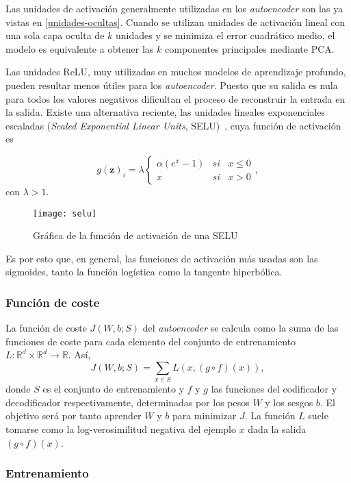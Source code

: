 Las unidades de activación generalmente utilizadas en los \textit{autoencoder} son las ya vistas en \autoref{unidades-ocultas}. Cuando se utilizan unidades de activación lineal con una sola capa oculta de $k$ unidades y se minimiza el error cuadrático medio, el modelo es equivalente a obtener las $k$ componentes principales mediante PCA.

Las unidades ReLU, muy utilizadas en muchos modelos de aprendizaje profundo, pueden resultar menos útiles para los \textit{autoencoder}. Puesto que su salida es nula para todos los valores negativos dificultan el proceso de reconstruir la entrada en la salida. Existe una alternativa reciente, las unidades lineales exponenciales escaladas (\textit{Scaled Exponential Linear Units}, SELU)~\cite{klambauer2017self}, cuya función de activación es

$$g(\textbf{z})_i = \lambda \left\{ \begin{array}{lcc}
             \alpha (e^x - 1) &   si  & x \leq 0
             \\ x &  si & x > 0
             \end{array}
   \right.,$$
con $\lambda > 1$.

\begin{figure}[htpb]
  \centering
  \texttt{[image: selu]}
  \caption{Gráfica de la función de activación de una SELU}
  \label{fig:selu}
\end{figure}

Es por esto que, en general, las funciones de activación más usadas son las sigmoides, tanto la función logística como la tangente hiperbólica.

\subsubsection{Función de coste}

La función de coste $J(W,b;S)$ del \textit{autoencoder} se calcula como la suma de las funciones de coste para cada elemento del conjunto de entrenamiento $L: \mathbb{R}^d \times \mathbb{R}^d \rightarrow \mathbb{R}$. Así, $$J(W,b;S) = \sum_{x \in S}L(x,(g \circ f)(x)),$$ donde $S$ es el conjunto de entrenamiento y $f$ y $g$ las funciones del codificador y decodificador respectivamente, determinadas por los pesos $W$ y los sesgos $b$. El objetivo será por tanto aprender $W$ y $b$ para minimizar $J$. La función $L$ suele tomarse como la log-verosimilitud negativa del ejemplo $x$ dada la salida $(g \circ f)(x)$.

\subsubsection{Entrenamiento}\label{entrenamiento-ae}

